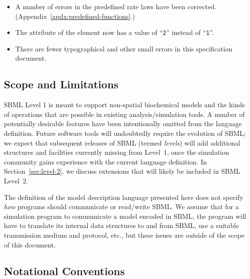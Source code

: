 \documentclass[10pt]{cekarticle}
\newenvironment{blockChanged}{\color{BrickRed}}{}
\begin{document}
\begin{blockChanged}
\begin{itemize}
\item A number of errors in the predefined rate laws have been corrected.
  (Appendix~\ref{apdx:predefined-functions}.)
  
\item The  attribute of the  element now has a
  value of ``\texttt{2}'' instead of ``\texttt{1}''.
  
\item There are fewer typographical and other small errors in this
  specification document.

\end{itemize}
\end{blockChanged}


\subsection{Scope and Limitations}

SBML Level 1 is meant to support non-spatial biochemical models and the
kinds of operations that are possible in existing analysis/simulation
tools.  A number of potentially desirable features have been intentionally
omitted from the language definition.  Future software tools will
undoubtedly require the evolution of SBML; we expect that subsequent
releases of SBML (termed \emph{levels}) will add additional structures and
facilities currently missing from Level~1, once the simulation community
gains experience with the current language definition.  In
Section~\ref{sec:level-2}, we discuss extensions that will likely be
included in SBML Level~2.

The definition of the model description language presented here does not
specify \emph{how} programs should communicate or read/write SBML.  We
assume that for a simulation program to communicate a model encoded in
SBML, the program will have to translate its internal data structures to
and from SBML, use a suitable transmission medium and protocol, etc., but
these issues are outside of the scope of this document.


\subsection{Notational Conventions}
\end{document}
